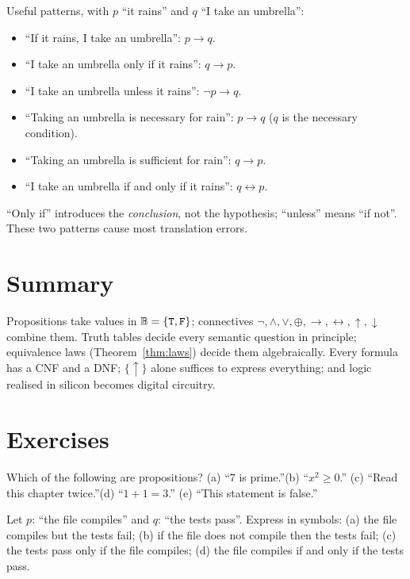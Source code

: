 Useful patterns, with $p$ ``it rains'' and $q$ ``I take an umbrella'':

\begin{itemize}
\item ``If it rains, I take an umbrella'': $p \to q$.
\item ``I take an umbrella only if it rains'': $q \to p$.
\item ``I take an umbrella unless it rains'': $\neg p \to q$.
\item ``Taking an umbrella is necessary for rain'': $p \to q$
  ($q$ is the necessary condition).
\item ``Taking an umbrella is sufficient for rain'': $q \to p$.
\item ``I take an umbrella if and only if it rains'': $q \leftrightarrow p$.
\end{itemize}

\begin{notebox}
``Only if'' introduces the \emph{conclusion}, not the hypothesis; ``unless''
means ``if not''. These two patterns cause most translation errors.
\end{notebox}

\section{Summary}

Propositions take values in $\mathbb{B} = \{\mathtt{T},\mathtt{F}\}$; connectives
$\neg, \wedge, \vee, \oplus, \to, \leftrightarrow, \uparrow, \downarrow$
combine them. Truth tables decide every semantic question in principle;
equivalence laws (Theorem~\ref{thm:laws}) decide them algebraically. Every
formula has a CNF and a DNF; $\{\uparrow\}$ alone suffices to express
everything; and logic realised in silicon becomes digital circuitry.

\section*{Exercises}

\begin{exercise}{\easy}
Which of the following are propositions?
(a) ``$7$ is prime.''\quad (b) ``$x^2 \geq 0$.''\quad
(c) ``Read this chapter twice.''\quad (d) ``$1+1=3$.''\quad
(e) ``This statement is false.''
\end{exercise}

\begin{exercise}{\easy}
Let $p$: ``the file compiles'' and $q$: ``the tests pass''. Express in symbols:
(a) the file compiles but the tests fail;
(b) if the file does not compile then the tests fail;
(c) the tests pass only if the file compiles;
(d) the file compiles if and only if the tests pass.
\end{exercise}

